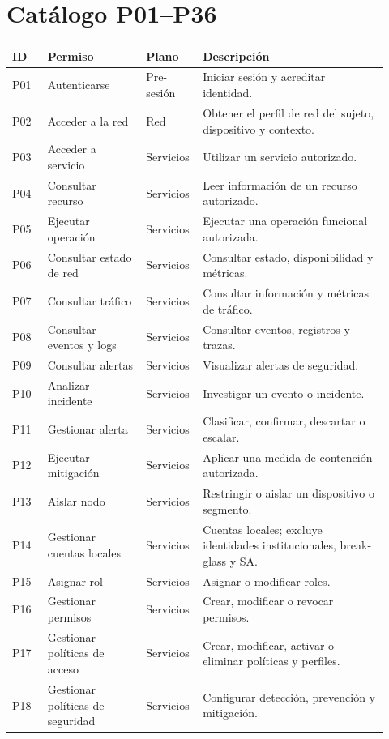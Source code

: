 \documentclass[11pt,a4paper]{report}
\begin{document}
\section{Catálogo P01--P36}
\begin{longtable}{p{0.09\linewidth}p{0.25\linewidth}p{0.11\linewidth}p{0.47\linewidth}}
\toprule
ID & Permiso & Plano & Descripción\\
\midrule
P01 & Autenticarse & Pre-sesión & Iniciar sesión y acreditar identidad.\\
P02 & Acceder a la red & Red & Obtener el perfil de red del sujeto, dispositivo y contexto.\\
P03 & Acceder a servicio & Servicios & Utilizar un servicio autorizado.\\
P04 & Consultar recurso & Servicios & Leer información de un recurso autorizado.\\
P05 & Ejecutar operación & Servicios & Ejecutar una operación funcional autorizada.\\
P06 & Consultar estado de red & Servicios & Consultar estado, disponibilidad y métricas.\\
P07 & Consultar tráfico & Servicios & Consultar información y métricas de tráfico.\\
P08 & Consultar eventos y logs & Servicios & Consultar eventos, registros y trazas.\\
P09 & Consultar alertas & Servicios & Visualizar alertas de seguridad.\\
P10 & Analizar incidente & Servicios & Investigar un evento o incidente.\\
P11 & Gestionar alerta & Servicios & Clasificar, confirmar, descartar o escalar.\\
P12 & Ejecutar mitigación & Servicios & Aplicar una medida de contención autorizada.\\
P13 & Aislar nodo & Servicios & Restringir o aislar un dispositivo o segmento.\\
P14 & Gestionar cuentas locales & Servicios & Cuentas locales; excluye identidades institucionales, break-glass y SA.\\
P15 & Asignar rol & Servicios & Asignar o modificar roles.\\
P16 & Gestionar permisos & Servicios & Crear, modificar o revocar permisos.\\
P17 & Gestionar políticas de acceso & Servicios & Crear, modificar, activar o eliminar políticas y perfiles.\\
P18 & Gestionar políticas de seguridad & Servicios & Configurar detección, prevención y mitigación.\\

\end{longtable}
\end{document}
